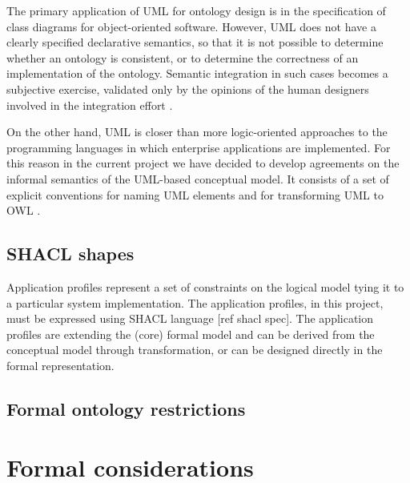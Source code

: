 	The primary application of UML \citep{fowler2004} for ontology design is in the specification of class diagrams for object-oriented software. However, UML does not have a clearly specified declarative semantics, so that it is not possible to determine whether an ontology is consistent, or to determine the correctness of an implementation of the ontology. Semantic integration in such cases becomes a subjective exercise, validated only by the opinions of the human designers involved in the integration effort \cite{grunninger2003}. 
	
	On the other hand, UML is closer than more logic-oriented approaches to the programming languages in which enterprise applications are implemented. For this reason in the current project we have decided to develop agreements on the informal semantics of the UML-based conceptual model. It consists of a set of explicit conventions for naming UML elements \cite{costetchi2020b} and for transforming UML to OWL \cite{costetchi2020c}.
	
	\subsection{SHACL shapes}
	\label{sec:shapes}
	
	Application profiles represent a set of constraints on the logical model tying it to a particular system implementation. The application profiles, in this project, must be expressed using SHACL language [ref shacl spec]. The application profiles are extending the (core) formal model and can be derived from the conceptual model through transformation, or can be designed directly in the formal representation. 
	
	\subsection{Formal ontology restrictions}
	\label{sec:restrictions}
	
	
	
\section{Formal considerations}	
\label{sec:formal-considerations}


